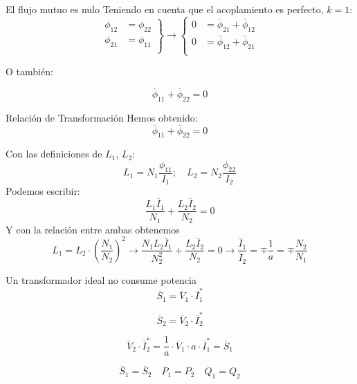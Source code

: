 \documentclass[xcolor={usenames,svgnames,dvipsnames}]{beamer}
\begin{document}
\begin{frame}[label={sec:org9df338c}]{El flujo mutuo es nulo}
Teniendo en cuenta que el acoplamiento es perfecto, \(k = 1\):
\[
  \left.
    \begin{array}{ll}
      \phi_{12} &= \phi_{22}\\
      \phi_{21} &= \phi_{11}\\
    \end{array} \right\} 
  \rightarrow
  \left\{
    \begin{array}{ll}
      0 &= \overline{\phi}_{21} + \overline{\phi}_{12}\\
      0 &= \overline{\phi}_{12} + \overline{\phi}_{21}\\
    \end{array}\right.
\]

O también:

\[
  \boxed{\overline{\phi}_{11} + \overline{\phi}_{22} = 0}
\]
\end{frame}
\begin{frame}[label={sec:orge8b9149}]{Relación de Transformación}
Hemos obtenido:
\[
  \overline{\phi}_{11} + \overline{\phi}_{22} = 0
\]

Con las definiciones de \(L_1\), \(L_2\):
\[
  L_1 = N_1 \frac{\phi_{11}}{I_1}; \quad L_2 = N_2 \frac{\phi_{22}}{I_2}
\]
Podemos escribir:
\[
  \frac{L_1 \overline{I}_1}{N_1} + \frac{L_2 \overline{I}_2}{N_2} = 0
\]
Y con la relación entre ambas obtenemos
\[
  L_1 = L_2 \cdot \left(\frac{N_1}{N_2}\right)^2
  \rightarrow
  \frac{N_1L_2 \overline{I}_1}{N^2_2} + \frac{L_2 \overline{I}_2}{N_2} = 0
  \rightarrow
  \boxed{\frac{\overline{I}_1}{\overline{I}_2} = \mp \frac{1}{a} = \mp \frac{N_2}{N_1}}
\]
\end{frame}
\begin{frame}[label={sec:orgeffb330}]{Un transformador ideal no consume potencia}
\[
  \overline{S}_1 = \overline{V}_1 \cdot \overline{I}_1^*
\]

\[
  \overline{S}_2 = \overline{V}_2 \cdot \overline{I}_2^* 
\]

\[
  \overline{V}_2 \cdot \overline{I}_2^* = \frac{1}{a} \cdot \overline{V}_1 \cdot a \cdot \overline{I}_1^* = \overline{S}_1
\]

\[
  \boxed{\overline{S}_1 = \overline{S}_2}
  \quad
  \boxed{P_1 = P_2}
  \quad
  \boxed{Q_1 = Q_2}
\]
\end{frame}
\end{document}
